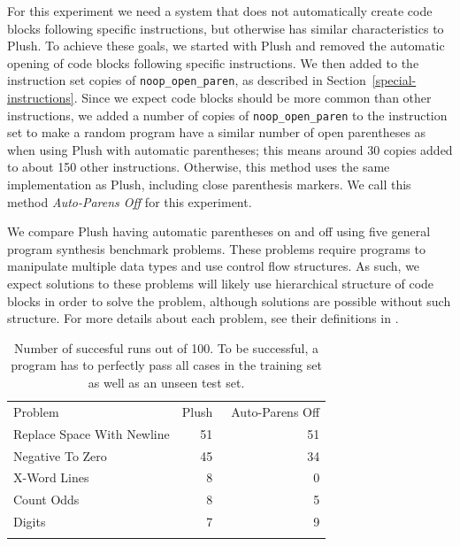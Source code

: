 \documentclass[graybox]{svmult}
\begin{document}
For this experiment we need a system that does not automatically create code blocks following specific instructions, but otherwise has similar characteristics to Plush. To achieve these goals, we started with Plush and removed the automatic opening of code blocks following specific instructions. We then added to the instruction set copies of \texttt{noop\_open\_paren}, as described in Section~\ref{special-instructions}. Since we expect code blocks should be more common than other instructions, we added a number of copies of \texttt{noop\_open\_paren} to the instruction set to make a random program have a similar number of open parentheses as when using Plush with automatic parentheses; this means around 30 copies added to about 150 other instructions. Otherwise, this method uses the same implementation as Plush, including close parenthesis markers. We call this method \textit{Auto-Parens Off} for this experiment.

We compare Plush having automatic parentheses on and off using five general program synthesis benchmark problems. These problems require programs to manipulate multiple data types and use control flow structures. As such, we expect solutions to these problems will likely use hierarchical structure of code blocks in order to solve the problem, although solutions are possible without such structure. For more details about each problem, see their definitions in \cite{Helmuth:2015:GECCO}.

\begin{table}[t]
\centering
\caption{
Number of succesful runs out of 100. To be successful, a program has to perfectly pass all cases in the training set as well as an unseen test set.
}
\label{no-auto-parens-experiment}       %
%
%
\begin{tabular}{l r r}
\hline\noalign{\smallskip}
Problem                    & Plush & ~Auto-Parens Off \\
\noalign{\smallskip}\svhline\noalign{\smallskip}
Replace Space With Newline &  51 & 51 \\
Negative To Zero           &  45 & 34 \\
X-Word Lines               &   8 &  0 \\
Count Odds                 &   8 &  5 \\
Digits                     &   7 &  9 \\
\noalign{\smallskip}\hline\noalign{\smallskip}
\end{tabular}
\end{table}
\end{document}
